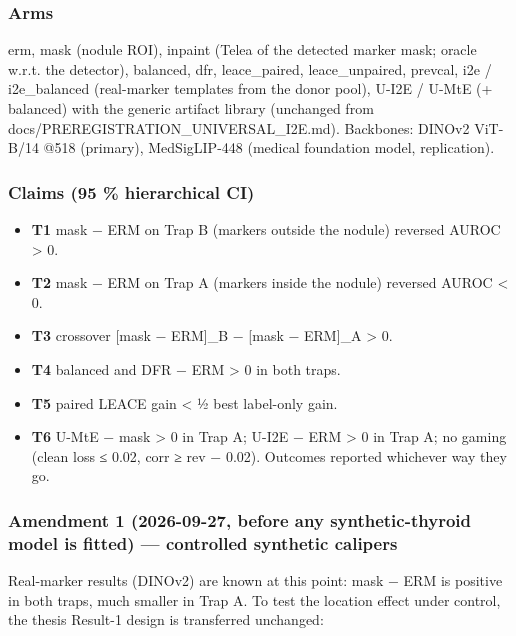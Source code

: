 {\subsubsection{Arms}\label{arms}

erm, mask (nodule ROI), inpaint (Telea of the detected marker mask; oracle w.r.t. the detector), balanced, dfr,
leace\_paired, leace\_unpaired, prevcal, i2e / i2e\_balanced (real-marker templates from the donor pool),
U-I2E / U-MtE (+ balanced) with the generic artifact library (unchanged from docs/PREREGISTRATION\_UNIVERSAL\_I2E.md).
Backbones: DINOv2 ViT-B/14 @518 (primary), MedSigLIP-448 (medical foundation model, replication).

\subsubsection{Claims (95 \% hierarchical CI)}\label{claims-95--hierarchical-ci}

\begin{itemize}

\item
  \textbf{T1} mask − ERM on Trap B (markers outside the nodule) reversed AUROC \textgreater{} 0.
\item
  \textbf{T2} mask − ERM on Trap A (markers inside the nodule) reversed AUROC \textless{} 0.
\item
  \textbf{T3} crossover {[}mask − ERM{]}\_B − {[}mask − ERM{]}\_A \textgreater{} 0.
\item
  \textbf{T4} balanced and DFR − ERM \textgreater{} 0 in both traps.
\item
  \textbf{T5} paired LEACE gain \textless{} ½ best label-only gain.
\item
  \textbf{T6} U-MtE − mask \textgreater{} 0 in Trap A; U-I2E − ERM \textgreater{} 0 in Trap A; no gaming (clean loss ≤ 0.02, corr ≥ rev − 0.02).
  Outcomes reported whichever way they go.
\end{itemize}

\subsubsection{Amendment 1 (2026-09-27, before any synthetic-thyroid model is fitted) --- controlled synthetic calipers}\label{amendment-1-2026-09-27-before-any-synthetic-thyroid-model-is-fitted--controlled-synthetic-calipers}

Real-marker results (DINOv2) are known at this point: mask − ERM is positive in both traps, much smaller in Trap A.
To test the location effect under control, the thesis Result-1 design is transferred unchanged:

}

